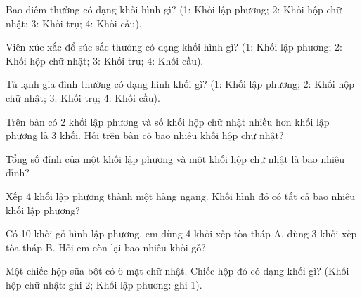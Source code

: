 \begin{ex}
Bao diêm thường có dạng khối hình gì? (1: Khối lập phương; 2: Khối hộp chữ nhật; 3: Khối trụ; 4: Khối cầu).
\end{ex}

\begin{ex}
Viên xúc xắc đổ súc sắc thường có dạng khối hình gì? (1: Khối lập phương; 2: Khối hộp chữ nhật; 3: Khối trụ; 4: Khối cầu).
\end{ex}

\begin{ex}
Tủ lạnh gia đình thường có dạng hình khối gì? (1: Khối lập phương; 2: Khối hộp chữ nhật; 3: Khối trụ; 4: Khối cầu).
\end{ex}

\begin{ex}
Trên bàn có 2 khối lập phương và số khối hộp chữ nhật nhiều hơn khối lập phương là 3 khối. Hỏi trên bàn có bao nhiêu khối hộp chữ nhật?
\end{ex}

\begin{ex}
Tổng số đỉnh của một khối lập phương và một khối hộp chữ nhật là bao nhiêu đỉnh?
\end{ex}

\begin{ex}
Xếp 4 khối lập phương thành một hàng ngang. Khối hình đó có tất cả bao nhiêu khối lập phương?
\end{ex}

\begin{ex}
Có 10 khối gỗ hình lập phương, em dùng 4 khối xếp tòa tháp A, dùng 3 khối xếp tòa tháp B. Hỏi em còn lại bao nhiêu khối gỗ?
\end{ex}

\begin{ex}
Một chiếc hộp sữa bột có 6 mặt chữ nhật. Chiếc hộp đó có dạng khối gì? (Khối hộp chữ nhật: ghi 2; Khối lập phương: ghi 1).
\end{ex}
